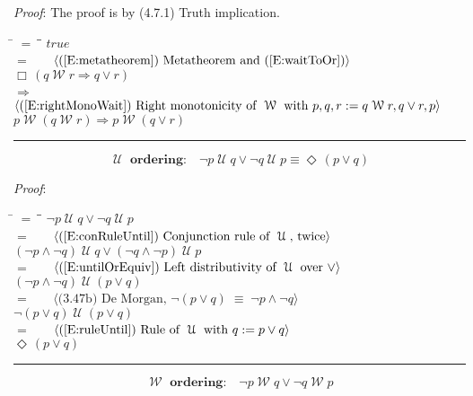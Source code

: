 \documentclass[12pt, fleqn, leqno]{article}
\newcommand{\lgap}{2pt}                             %
\newcommand{\mymathindent}{24pt}                    %
\newcommand{\equivs}{\ensuremath{\;\equiv\;}}       %
\newcommand{\impl}{\ensuremath{\Rightarrow}}        %
\newcommand{\Until}{\;\mathcal{U}\;}
\newcommand{\Wait}{\;\mathcal{W}\;}
\newcommand{\Event}{\Diamond\,}
\newcommand{\Always}{\Box\,}
\newcommand{\myqed}{\rule[-.23ex]{1.2ex}{2.0ex}}
\newcommand{\myqedtab}{\hspace{384pt}}              %
\newcommand{\Gll} {\langle}                         %
\newcommand{\Ggg} {\rangle}                         %
\newcommand{\Hint}[1]     {\ \ \ $\Gll              \mbox{#1} \Ggg$ }   %
\begin{document}
\emph{Proof}: The proof is by (4.7.1) Truth implication.
\begin{tabbing}
\hspace{\mymathindent} \= $= \;$ \= \myqedtab \= \kill
  \> \>   $true$\\[\lgap]
  \> $=$ \> \Hint{(\ref{E:metatheorem}) Metatheorem and (\ref{E:waitToOr})} \\[\lgap]
  \> \>   $\Always (q\Wait r\impl q\lor r)$\\[\lgap]
  \> $\impl$  \>  \Hint{(\ref{E:rightMonoWait}) Right monotonicity of $\Wait$ with $p,q,r := q\Wait r, q\lor r,p$}\\[\lgap]
  \> \>   $p \Wait (q \Wait r) \impl p \Wait (q \lor r)$ \quad \myqed
\end{tabbing}
\begin{equation}\label{E:untilOrdering}
\textbf{$\Until$ ordering:}\quad \neg p \Until q \lor \neg q \Until p \equiv \Event(p\lor q)
\end{equation}

\emph{Proof}:
\begin{tabbing}
\hspace{\mymathindent} \= $= \;$ \= \myqedtab \= \kill
  \> \>   $\neg p \Until q \lor \neg q \Until p$\\[\lgap]
  \> $=$ \> \Hint{(\ref{E:conRuleUntil}) Conjunction rule of $\Until$, twice}\\[\lgap]
  \> \>   $(\neg p\land \neg q) \Until q \lor (\neg q \land \neg p)\Until p$\\[\lgap]
  \> $=$  \>  \Hint{(\ref{E:untilOrEquiv}) Left distributivity of $\Until$ over $\lor$}\\[\lgap]
  \> \>   $(\neg p\land \neg q) \Until (p\lor q)$\\[\lgap]
  \> $=$  \>  \Hint{(3.47b) De Morgan, $\neg(p\lor q)\equivs \neg p\land\neg q$}\\[\lgap]
  \> \>   $\neg (p\lor q)\Until (p\lor q)$\\[\lgap]
  \> $=$  \>  \Hint{(\ref{E:ruleUntil}) Rule of $\Until$ with $q := p\lor q$}\\[\lgap]
  \> \>   $\Event (p\lor q)$ \quad \myqed
\end{tabbing}
\begin{equation}\label{E:waitOrdering}
\textbf{$\Wait$ ordering:}\quad \neg p \Wait q \lor \neg q \Wait p
\end{equation}
\end{document}
